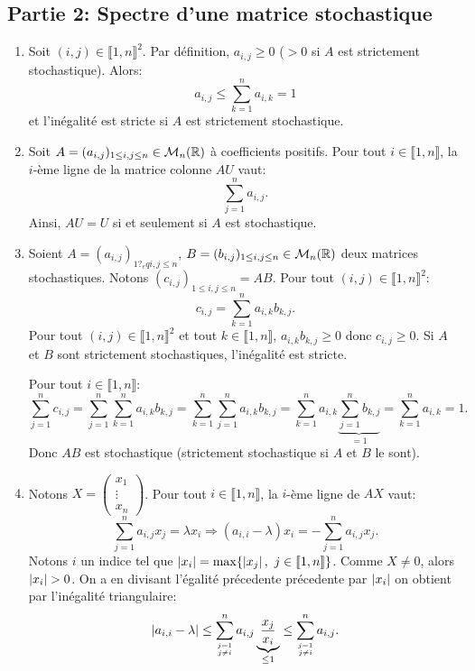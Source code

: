 \subsection*{Partie 2: Spectre d'une matrice stochastique}
\begin{enumerate}

 \item Soit $(i,j)\in \llbracket 1, n\rrbracket^{2}$. Par définition, $a_{i,j}\geq 0$ ($>0$ si $A$ est strictement stochastique). Alors:
 \[ a_{i,j}\leq \sum_{k=1}^{n}a_{i,k} = 1\]
 et l'inégalité est stricte si $A$ est strictement stochastique.
 
 
 \item Soit $A = (a_{i,j})_{1\leq i,j\leq n}\in \mathcal{M}_{n}(\mathbb{R})$ à coefficients positifs. Pour tout $i\in \llbracket 1, n\rrbracket$, la $i$-ème ligne de la matrice colonne $AU$ vaut:
 \[ \sum_{j=1}^{n}a_{i,j}. \]
 Ainsi, $AU = U$ si et seulement si $A$ est stochastique. 
 
 
 
 
 
 \item Soient $A = (a_{i,j})_{1?_eq i,j\leq n}$, $B = (b_{i,j})_{1\leq i,j\leq n}\in \mathcal{M}_{n}(\mathbb{R})$ deux matrices stochastiques. Notons $(c_{i,j})_{1\leq i,j\leq n} = AB$. Pour tout 
 $(i,j)\in \llbracket 1, n\rrbracket^{2}$:
 \[ c_{i,j} = \sum_{k=1}^{n}a_{i,k}b_{k,j}.\]
 Pour tout $(i,j)\in \llbracket 1, n\rrbracket^{2}$ et tout $k\in \llbracket 1, n\rrbracket$, $a_{i,k}b_{k,j}\geq 0$ donc $c_{i,j}\geq 0$. Si $A$ et $B$ sont strictement stochastiques, l'inégalité est stricte. 
 
 
 Pour tout $i\in \llbracket 1, n\rrbracket$:
 \[ \sum_{j=1}^{n}c_{i,j} = \sum_{j=1}^{n}\sum_{k=1}^{n}a_{i,k}b_{k,j}  = \sum_{k=1}^{n}\sum_{j=1}^{n}a_{i,k}b_{k,j} = \sum_{k=1}^{n}a_{i,k}\underbrace{\sum_{j=1}^{n}b_{k,j}}_{=1} = \sum_{k=1}^{n}a_{i,k} = 1.\]
 Donc $AB$ est stochastique (strictement stochastique si $A$ et $B$ le sont).
 
 
 
 
 
 \item Notons $X = \begin{pmatrix}
                        x_{1}\\
                        \vdots \\
                        x_{n}
                       \end{pmatrix}$. Pour tout $i\in \llbracket 1, n\rrbracket$, la $i$-ème ligne de $AX$ vaut:
                       \[ \sum_{j=1}^{n}a_{i,j}x_{j} = \lambda x_{i} \Longrightarrow  (a_{i,i}-\lambda)x_{i} = - \sum_{j=1}^{n}a_{i,j}x_{j}.\]
      Notons $i$ un indice tel que $\left\vert x_{i}\right\vert = \max \{ \left\vert x_{j}\right\vert,\ j\in \llbracket 1, n\rrbracket \}$. Comme $X\neq 0$, alors $\left\vert x_{i}\right\vert >0$. On a en divisant l'égalité précedente précedente par $\left\vert x_{i}\right\vert$
      on obtient par l'inégalité triangulaire:
      \[ \abs{a_{i,i}-\lambda} \leq \sum_{\empil{j=1}{j\neq i}}^{n}a_{i,j}\underbrace{\frac{x_{j}}{x_{i}}}_{\leq 1} \leq \sum_{\empil{j=1}{j\neq i}}^{n}a_{i,j}.\]
      

\end{enumerate}
